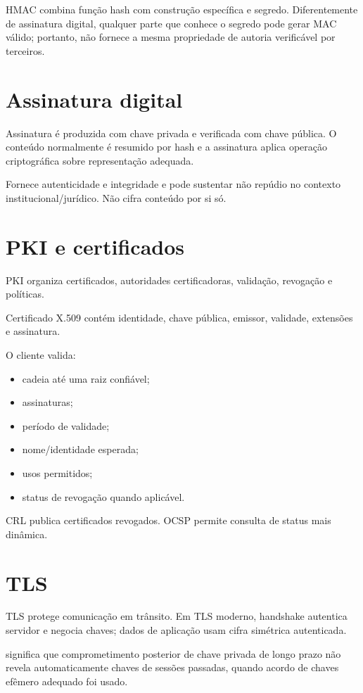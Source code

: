 HMAC combina função hash com construção específica e segredo. Diferentemente de assinatura digital, qualquer parte que conhece o segredo pode gerar MAC válido; portanto, não fornece a mesma propriedade de autoria verificável por terceiros.

\section{Assinatura digital}

Assinatura é produzida com chave privada e verificada com chave pública. O conteúdo normalmente é resumido por hash e a assinatura aplica operação criptográfica sobre representação adequada.

Fornece autenticidade e integridade e pode sustentar não repúdio no contexto institucional/jurídico. Não cifra conteúdo por si só.

\section{PKI e certificados}

PKI organiza certificados, autoridades certificadoras, validação, revogação e políticas.

Certificado X.509 contém identidade, chave pública, emissor, validade, extensões e assinatura.

O cliente valida:
\begin{itemize}
\item cadeia até uma raiz confiável;
\item assinaturas;
\item período de validade;
\item nome/identidade esperada;
\item usos permitidos;
\item status de revogação quando aplicável.
\end{itemize}

CRL publica certificados revogados. OCSP permite consulta de status mais dinâmica.

\section{TLS}

TLS protege comunicação em trânsito. Em TLS moderno, handshake autentica servidor e negocia chaves; dados de aplicação usam cifra simétrica autenticada.

 significa que comprometimento posterior de chave privada de longo prazo não revela automaticamente chaves de sessões passadas, quando acordo de chaves efêmero adequado foi usado.

